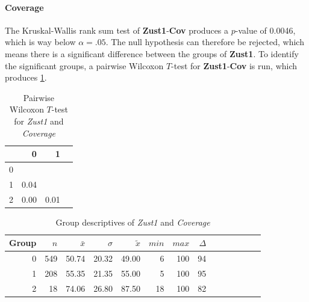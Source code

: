 \paragraph{Coverage}
The Kruskal-Wallis rank sum test of \textbf{Zust1}-\textbf{Cov} produces a $p$-value of 0.0046, which is way below $\alpha=.05$. The null hypothesis can therefore be rejected, which means there is a significant difference between the groups of \textbf{Zust1}. To identify the significant groups, a pairwise Wilcoxon $T$-test for \textbf{Zust1}-\textbf{Cov} is run, which produces \cref{tbl:wilcoxon_baysis_initiator_Zust1_Cov}. 
\begin{table}[ht]
	\small
	\centering
    \begin{tabular}{rrrr}
        \toprule
          & 0 & 1 \\ 
        \midrule
        0 &      & \\ 
        1 & 0.04 & \\ 
        2 & 0.00 & 0.01 \\ 
        \bottomrule
      \end{tabular}
    \caption{Pairwise Wilcoxon $T$-test for \textit{Zust1} and \textit{Coverage}}
    \label{tbl:wilcoxon_baysis_initiator_Zust1_Cov}
\end{table}
\begin{table}[ht]
	\small
	\centering
    \begin{tabular}{rrrrrrrrrrrrrr}
        \toprule
        Group & $n$ & $\bar{x}$ & $\sigma$ & $\tilde{x}$ & $min$ & $max$ & $\Delta$ \\
        \midrule
        0 & 549 & 50.74 & 20.32 & 49.00 & 6  & 100 & 94 \\ 
        1 & 208 & 55.35 & 21.35 & 55.00 & 5  & 100 & 95 \\ 
        2 & 18  & 74.06 & 26.80 & 87.50 & 18 & 100 & 82 \\ 
        \bottomrule
      \end{tabular}
    \caption{Group descriptives of \textit{Zust1} and \textit{Coverage}}
    \label{tbl:descriptives_baysis_initiator_Zust1_Cov}
\end{table}



